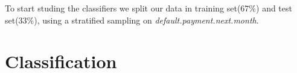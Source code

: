 \documentclass[fleqn,10pt]{SelfArx} %
\begin{document}
	To start studing the classifiers we split our data in training set(67\%) and test set(33\%), using a stratified sampling on \textit{default.payment.next.month}.
	
	\section{Classification}
	
	
	
	
	
\end{document}
